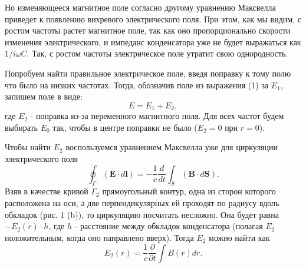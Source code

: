 \documentclass[a4paper, 12pt]{article}
\begin{document}
Но изменяющееся магнитное поле согласно другому уравнению Максвелла приведет к появлению вихревого электрического поля. При этом, как мы видим, с ростом частоты растет магнитное поле, так как оно пропорционально скорости изменения электрического, и импеданс конденсатора уже не будет выражаться как $1 / i \omega C$. Так, с ростом частоты электрическое поле утратит свою однородность.

Попробуем найти правильное электрическое поле, введя поправку к тому полю что было на низких частотах. Тогда, обозначив поле из выражения (1) за $E_{1}$, запишем поле в виде:
\begin{displaymath}E=E_{1}+E_{2},\end{displaymath}
\newpage
где $E_{2}$ - поправка из-за переменного магнитного поля. Для всех частот будем выбирать $E_{0}$ так, чтобы в центре поправки не было ($E_{2} = 0$ при $r = 0$).

Чтобы найти $E_{2}$ воспользуемся уравнением Максвелла уже для циркуляции электрического поля
\begin{equation}\oint_{\Gamma} (\boldsymbol{E} \cdot d \boldsymbol{l})=-\frac{1}{c}\frac{d}{d t} \int_{S} (\boldsymbol{B} \cdot d\boldsymbol{S}).\end{equation}
Взяв в качестве кривой $\Gamma_{2}$ прямоугольный контур, одна из сторон которого расположена на оси, а две перпендикулярных ей проходят по радиусу вдоль обкладок (рис. 1 (b)), то циркуляцию посчитать несложно. Она будет равна $-E_{2}(r) \cdot h$, где $h$ - расстояние между обкладок конденсатора (полагая $E_{2}$ положительным, когда оно направлено вверх). Тогда $E_{2}$ можно найти как
\begin{equation}E_{2}(r)=\frac{1}{c}\frac{\partial}{\partial t} \int B(r) d r.\end{equation}
\end{document}
